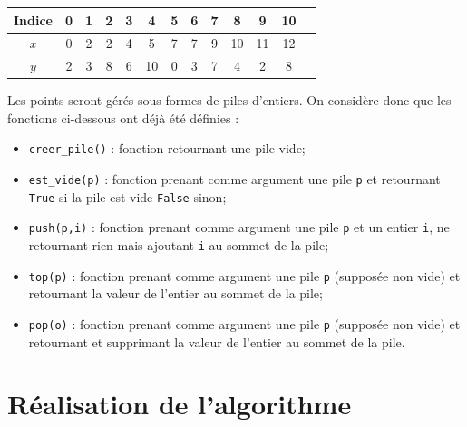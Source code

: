 \documentclass[10pt,fleqn]{article} %
\begin{document}
\begin{center}
\begin{tabular}{|c||c|c|c|c|c|c|c|c|c|c|c|c|}
\hline 
Indice & 0 & 1 & 2 & 3 & 4 & 5 & 6 & 7 & 8 & 9 & 10  \\
\hline\hline
$x$ & 0 & 2 & 2 & 4 & 5 & 7 & 7 & 9 & 10 & 11 & 12 \\
\hline 
$y$ & 2 & 3 & 8 & 6 & 10 & 0 & 3 & 7 & 4 & 2 & 8 \\
\hline
\end{tabular}
\end{center}

Les points seront gérés sous formes de piles d'entiers. On considère donc que les fonctions ci-dessous ont déjà été définies : 
\begin{itemize}
\item \texttt{creer\_pile()} : fonction retournant une pile vide;
\item \texttt{est\_vide(p)} : fonction prenant comme argument une pile \texttt{p} et retournant \texttt{True} si la pile est vide \texttt{False} sinon;
\item \texttt{push(p,i)} : fonction prenant comme argument une pile \texttt{p} et un entier \texttt{i},  ne retournant rien mais ajoutant \texttt{i} au sommet de la pile;
\item \texttt{top(p)} :  fonction prenant comme argument une pile \texttt{p} (supposée non vide) et retournant la valeur de l'entier au sommet de la pile;
\item \texttt{pop(o)} :  fonction prenant comme argument une pile \texttt{p} (supposée non vide) et retournant et supprimant la valeur de l'entier au sommet de la pile.
\end{itemize}

\fi


\section{Réalisation de l'algorithme}
\end{document}
